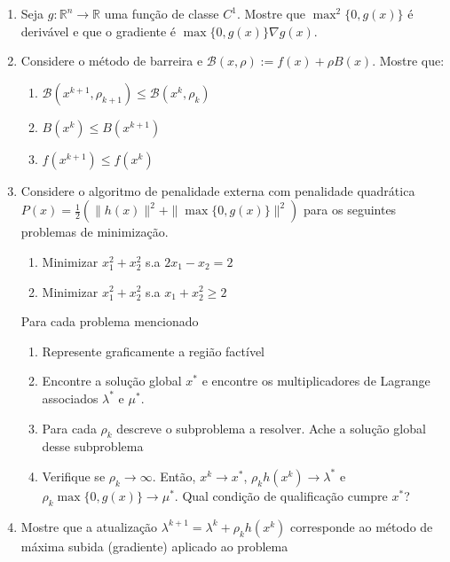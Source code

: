 \documentclass[a4paper,latin]{article}
\begin{document}
\begin{enumerate}
    {\it Observação:} Se 
    $\Omega:=\{x: c_{i}\geq 0, i=1,\dots, m\}$, a função de penalidade inversa é 
    $\sum_{i=1}^{m} \frac{1}{c_i(x)}$.
    \item Seja $g:\mathbb{R}^{n}\rightarrow \mathbb{R}$ uma função 
    de classe $C^1$. Mostre que $\max^2\{0,g(x)\}$ é derivável 
    e que o gradiente é 
    $\max\{0,g(x)\}\nabla g(x)$.
      \item Considere o método de barreira 
    e $\mathcal{B}(x,\rho):=f(x)+\rho B(x)$. Mostre que:
      \begin{enumerate}
      	\item $\mathcal{B}(x^{k+1}, \rho_{k+1}) \leq 
      	\mathcal{B}(x^{k}, \rho_{k})$
      	\item $B(x^{k}) \leq B(x^{k+1})$ 
      	\item $f(x^{k+1}) \leq f(x^k)$
      \end{enumerate}
    \item Considere o algoritmo de penalidade externa com penalidade
    quadrática 
    $P(x)=\frac{1}{2}(\|h(x)\|^2+
    \|\max\{0,g(x)\}\|^2)$ para os seguintes problemas de minimização.
      \begin{enumerate}
      	\item 
      	Minimizar $x_1^{2}+x_2^2$ s.a
      	$2x_1-x_2=2$
      	\item Minimizar $x_1^{2}+x_2^2$ s.a
      	$x_1+x_2^2\geq 2$
      \end{enumerate}
     Para cada problema mencionado 
       \begin{enumerate}
       	\item Represente graficamente a região factível
       	\item Encontre a solução global 
       	$x^{*}$ e 
       	encontre os multiplicadores de Lagrange associados $\lambda^*$ e 
       	$\mu^*$.
       	\item Para cada $\rho_{k}$ descreve o subproblema a resolver. Ache 
       	a solução global desse subproblema
       	\item Verifique se $\rho_{k}\rightarrow \infty$. 
       	Então, $x^{k}\rightarrow x^{*}$, 
       	$\rho_{k}h(x^k)\rightarrow \lambda^*$
       	e $\rho_{k}\max\{0,g(x)\}\rightarrow
       	\mu^*$. 
       	Qual condição de qualificação cumpre $x^*$? 
       \end{enumerate}
    \item Mostre que a atualização 
    $\lambda^{k+1}=\lambda^{k}+\rho_{k}h(x^k)$
    corresponde ao método de máxima subida (gradiente) aplicado ao problema 

\end{enumerate}
\end{document}
